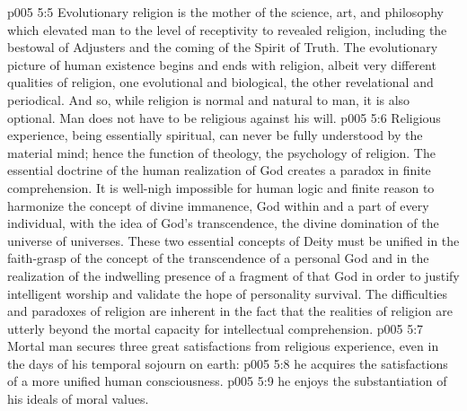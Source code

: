 \vs p005 5:5 Evolutionary religion is the mother of the science, art, and philosophy which elevated man to the level of receptivity to revealed religion, including the bestowal of Adjusters and the coming of the Spirit of Truth. The evolutionary picture of human existence begins and ends with religion, albeit very different qualities of religion, one evolutional and biological, the other revelational and periodical. And so, while religion is normal and natural to man, it is also optional. Man does not have to be religious against his will.
\vs p005 5:6 \pc Religious experience, being essentially spiritual, can never be fully understood by the material mind; hence the function of theology, the psychology of religion. The essential doctrine of the human realization of God creates a paradox in finite comprehension. It is well\hyp{}nigh impossible for human logic and finite reason to harmonize the concept of divine immanence, God within and a part of every individual, with the idea of God’s transcendence, the divine domination of the universe of universes. These two essential concepts of Deity must be unified in the faith\hyp{}grasp of the concept of the transcendence of a personal God and in the realization of the indwelling presence of a fragment of that God in order to justify intelligent worship and validate the hope of personality survival. The difficulties and paradoxes of religion are inherent in the fact that the realities of religion are utterly beyond the mortal capacity for intellectual comprehension.
\vs p005 5:7 \pc Mortal man secures three great satisfactions from religious experience, even in the days of his temporal sojourn on earth:
\vs p005 5:8 \bibnobreakspace {} he acquires the satisfactions of a more unified human consciousness.
\vs p005 5:9 \bibnobreakspace {} he enjoys the substantiation of his ideals of moral values.

